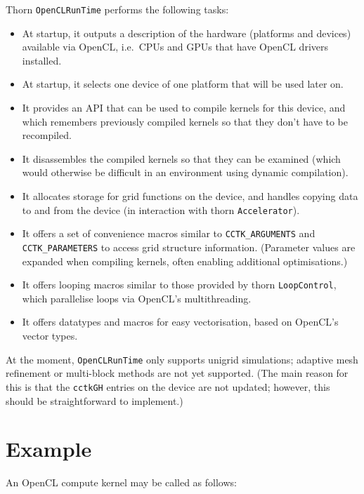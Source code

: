 Thorn \texttt{OpenCLRunTime} performs the following tasks:
\begin{itemize}
  \item At startup, it outputs a description of the hardware
    (platforms and devices) available via OpenCL, i.e.\ CPUs and GPUs
    that have OpenCL drivers installed.
  \item At startup, it selects one device of one platform that will be
    used later on.
  \item It provides an API that can be used to compile kernels for
    this device, and which remembers previously compiled kernels so
    that they don't have to be recompiled.
  \item It disassembles the compiled kernels so that they can be
    examined (which would otherwise be difficult in an environment
    using dynamic compilation).
  \item It allocates storage for grid functions on the device, and
    handles copying data to and from the device (in interaction with
    thorn \texttt{Accelerator}).
  \item It offers a set of convenience macros similar to
    \texttt{CCTK\_ARGUMENTS} and \texttt{CCTK\_PARAMETERS} to access
    grid structure information. (Parameter values are expanded when
    compiling kernels, often enabling additional optimisations.)
  \item It offers looping macros similar to those provided by thorn
    \texttt{LoopControl}, which parallelise loops via OpenCL's
    multithreading.
  \item It offers datatypes and macros for easy vectorisation, based
    on OpenCL's vector types.
\end{itemize}

At the moment, \texttt{OpenCLRunTime} only supports unigrid
simulations; adaptive mesh refinement or multi-block methods are not
yet supported. (The main reason for this is that the \texttt{cctkGH}
entries on the device are not updated; however, this should be
straightforward to implement.)



\section{Example}

An OpenCL compute kernel may be called as follows:

